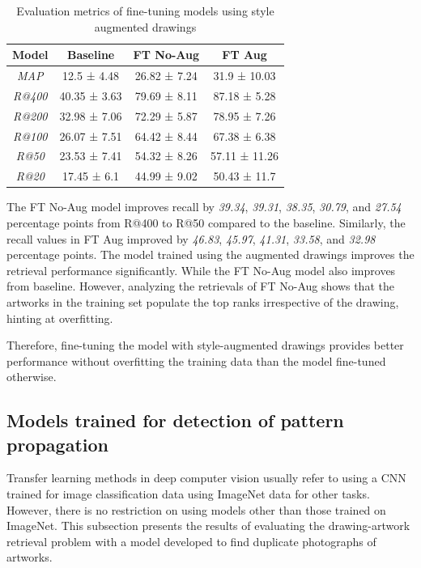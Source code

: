 \begin{table}[ht]
    \centering
    \begin{tabular}{c||c|c|c}
    \hline
        Model & Baseline & FT No-Aug & FT Aug \\ \hline \hline
        \textit{MAP} & 12.5 ± 4.48 & 26.82 ± 7.24 & 31.9 ± 10.03 \\ 
        \textit{R@400} & 40.35 ± 3.63 & 79.69 ± 8.11 & 87.18 ± 5.28 \\
        \textit{R@200} & 32.98 ± 7.06 & 72.29 ± 5.87 & 78.95 ± 7.26 \\
        \textit{R@100} & 26.07 ± 7.51 & 64.42 ± 8.44 & 67.38 ± 6.38 \\
        \textit{R@50} & 23.53 ± 7.41 & 54.32 ± 8.26 & 57.11 ± 11.26 \\
        \textit{R@20} & 17.45 ± 6.1 & 	44.99 ± 9.02 & 50.43 ± 11.7 \\ 
    \end{tabular}
    \caption{Evaluation metrics of fine-tuning models using style augmented drawings}
    \label{tab:aug-comp}
\end{table}

The FT No-Aug model improves recall by \textit{39.34}, \textit{39.31}, \textit{38.35}, \textit{30.79}, and \textit{27.54} percentage points from R@400 to R@50 compared to the baseline. Similarly, the recall values in FT Aug improved by \textit{46.83}, \textit{45.97}, \textit{41.31}, \textit{33.58}, and \textit{32.98} percentage points. The model trained using the augmented drawings improves the retrieval performance significantly. While the FT No-Aug model also improves from baseline. However, analyzing the retrievals of FT No-Aug shows that the artworks in the training set populate the top ranks irrespective of the drawing, hinting at overfitting.

Therefore, fine-tuning the model with style-augmented drawings provides better performance without overfitting the training data than the model fine-tuned otherwise.

\subsection{Models trained for detection of pattern propagation}\label{chap:5:sec:ludo-models}

Transfer learning methods in deep computer vision usually refer to using a CNN trained for image classification data using ImageNet data for other tasks. However, there is no restriction on using models other than those trained on ImageNet. This subsection presents the results of evaluating the drawing-artwork retrieval problem with a model developed to find duplicate photographs of artworks.

